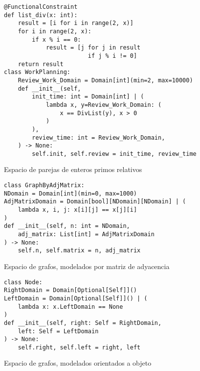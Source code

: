 \begin{listing}[!ht]
    \begin{verbatim}
@FunctionalConstraint
def list_div(x: int):
    result = [i for i in range(2, x)]
    for i in range(2, x):
        if x % i == 0:
            result = [j for j in result 
                        if j % i != 0]
    return result
class WorkPlanning:
    Review_Work_Domain = Domain[int](min=2, max=10000)
    def __init__(self,
        init_time: int = Domain[int] | (
            lambda x, y=Review_Work_Domain: (
                x == DivList(y), x > 0
            )
        ),
        review_time: int = Review_Work_Domain,
    ) -> None:
        self.init, self.review = init_time, review_time
    \end{verbatim}
    \caption{Espacio de parejas de enteros primos relativos}
    \label{lst:primos}
\end{listing}

\newpage
\begin{listing}[!ht]
    \begin{verbatim}
class GraphByAdjMatrix:
NDomain = Domain[int](min=0, max=1000)
AdjMatrixDomain = Domain[bool][NDomain][NDomain] | (
    lambda x, i, j: x[i][j] == x[j][i]
)
def __init__(self, n: int = NDomain,
    adj_matrix: List[int] = AdjMatrixDomain
) -> None:
    self.n, self.matrix = n, adj_matrix
    \end{verbatim}
    \caption{Espacio de grafos, modelados por matriz de adyacencia}
    \label{lst:adj}
\end{listing}


\begin{listing}[!ht]
    \begin{verbatim}
class Node:
RightDomain = Domain[Optional[Self]]()
LeftDomain = Domain[Optional[Self]]() | (
    lambda x: x.LeftDomain == None
)
def __init__(self, right: Self = RightDomain,
    left: Self = LeftDomain
) -> None:
    self.right, self.left = right, left
    \end{verbatim}
    \caption{Espacio de grafos, modelados orientados a objeto}
    \label{lst:node}
\end{listing}


